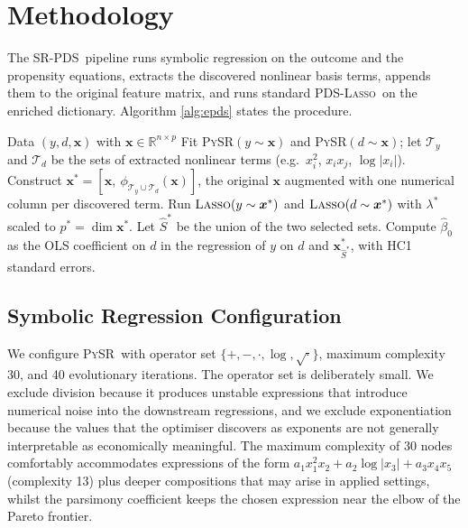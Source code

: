 \documentclass[11pt, a4paper]{article}
\theoremstyle{plain}
\theoremstyle{definition}
\theoremstyle{remark}
\newcommand{\lasso}{\textsc{Lasso}}
\newcommand{\pds}{\textsc{PDS}}
\newcommand{\pysr}{\textsc{PySR}}
\newcommand{\epds}{\textsc{SR-PDS}}
\newcommand{\R}{\mathbb{R}}
\newcommand{\Shat}{\hat{S}}
\newcommand{\betahat}{\hat{\beta}_0}
\newcommand{\Xstar}{\bm{x}^{*}}
\begin{document}
\section{Methodology}
\label{sec:method}

The \epds\ pipeline runs symbolic regression on the outcome and
the propensity equations, extracts the discovered nonlinear basis
terms, appends them to the original feature matrix, and runs
standard \pds-\lasso\ on the enriched dictionary. Algorithm
\ref{alg:epds} states the procedure.

\begin{algorithm}[H]
\caption{Symbolic-Regression Post-Double Selection (\epds)}
\label{alg:epds}
\begin{algorithmic}[1]
    \Require Data $(y, d, \bm{x})$ with $\bm{x} \in \R^{n \times p}$
    \State Fit \pysr$(y \sim \bm{x})$ and \pysr$(d \sim \bm{x})$;
           let $\mathcal{T}_y$ and $\mathcal{T}_d$ be the sets of
           extracted nonlinear terms (e.g.\ $x_i^2$, $x_i x_j$,
           $\log|x_i|$).
    \State Construct $\Xstar = [\bm{x},\
           \phi_{\mathcal{T}_y \cup \mathcal{T}_d}(\bm{x})]$, the
           original $\bm{x}$ augmented with one numerical column
           per discovered term.
    \State Run $\lasso(y \sim \Xstar)$ and $\lasso(d \sim \Xstar)$
           with $\lambda^*$ scaled to $p^* = \dim\Xstar$. Let
           $\Shat^*$ be the union of the two selected sets.
    \State Compute $\betahat$ as the OLS coefficient on $d$ in
           the regression of $y$ on $d$ and $\Xstar_{\Shat^*}$,
           with HC1 standard errors.
\end{algorithmic}
\end{algorithm}

\subsection{Symbolic Regression Configuration}

We configure \pysr\ with operator set $\{+, -, \cdot, \log,
\sqrt{\cdot}\}$, maximum complexity 30, and 40 evolutionary
iterations. The operator set is deliberately small. We exclude
division because it produces unstable expressions that introduce
numerical noise into the downstream regressions, and we exclude
exponentiation because the values that the optimiser discovers as
exponents are not generally interpretable as economically
meaningful. The maximum complexity of 30 nodes comfortably
accommodates expressions of the form $a_1 x_1^2 x_2 + a_2 \log|x_3| + a_3 x_4
x_5$ (complexity 13) plus deeper compositions that may arise in
applied settings, whilst the parsimony coefficient keeps the
chosen expression near the elbow of the Pareto frontier.
\end{document}
